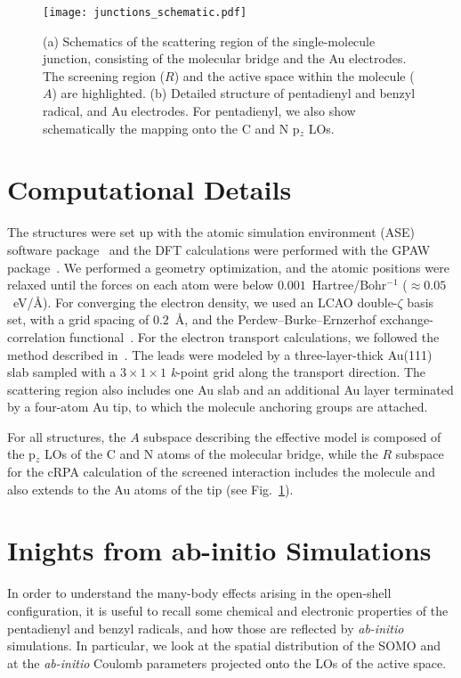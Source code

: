 \documentclass[aps,prx,twocolumn,superscriptaddress]{revtex4-2}
\begin{document}
\begin{figure}[bhp]
\texttt{[image: junctions\_schematic.pdf]}
\caption{ (a) Schematics of the scattering region of the single-molecule junction, 
consisting of the molecular bridge and the Au electrodes. 
The screening region ($R$) and the active space within the molecule ($A$) are highlighted. 
(b) Detailed structure of pentadienyl and benzyl radical, and Au electrodes. 
For pentadienyl, we also show schematically the mapping onto the C and N p$_z$ LOs. }
\label{fig:junctions_schematic}  
\end{figure}



\section{Computational Details}\label{sec:computational}
The structures were set up with the atomic simulation environment (ASE) software package~\cite{larsenJPCM29} 
and the DFT calculations were performed with the GPAW package~\cite{mortensenPRB71,larsenPRB80,enkovaaraJPCM22}. 
We performed a geometry optimization, and the atomic positions were relaxed 
until the forces on each atom were below $0.001$~Hartree/Bohr$^{-1}$ ($\approx 0.05$~eV/\AA). 
For converging the electron density, we used an LCAO double-$\zeta$ basis set, with a grid spacing of $0.2$~\AA,  
and the Perdew–Burke–Ernzerhof exchange-correlation functional~\cite{perdew_burke_ernzerhof1996}.
For the electron transport calculations, we followed the method described in~\cite{gandus2020efficient}. 
The leads were modeled by a three-layer-thick Au(111) slab 
sampled with a $3\times1\times1$ \textit{k}-point grid along the transport direction. 
The scattering region also includes one Au slab and an additional Au layer terminated by a four-atom Au tip, 
to which the molecule anchoring groups are attached.

For all structures, the $A$ subspace describing the effective model is composed of 
the p$_z$ LOs of the C and N atoms of the molecular bridge, while
the $R$ subspace for the cRPA calculation of the screened interaction  
includes the molecule and also extends to the Au atoms of the tip (see Fig.~\ref{fig:junctions_schematic}).


\section{Inights from ab-initio Simulations}
In order to understand the many-body effects arising in the open-shell configuration, 
it is useful to recall some chemical and electronic properties 
of the pentadienyl and benzyl radicals, and how those are reflected by \emph{ab-initio} simulations. 
In particular, we look at the spatial distribution of the SOMO 
and at the \emph{ab-initio} Coulomb parameters projected onto the LOs of the active space. 
\end{document}
